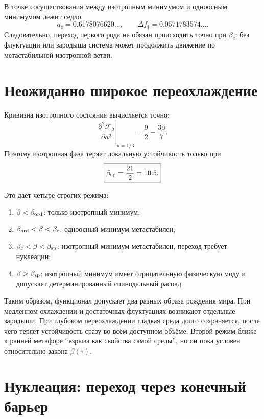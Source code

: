 В точке сосуществования между изотропным минимумом и одноосным минимумом
лежит седло
\begin{equation}
 a_\ddagger=0.6178076620\ldots,
 \qquad
 \Delta f_\ddagger=0.0571783574\ldots.
 \label{eq:v6-projective-coexistence-barrier}
\end{equation}
Следовательно, переход первого рода не обязан происходить точно при
$\beta_c$: без флуктуации или зародыша система может продолжить движение
по метастабильной изотропной ветви.

\section{Неожиданно широкое переохлаждение}

Кривизна изотропного состояния вычисляется точно:
\begin{equation}
 \left.\frac{\partial^2\mathcal F_\beta}{\partial a^2}
 \right|_{a=1/3}
 =\frac92-\frac{3\beta}{7}.
 \label{eq:v6-isotropic-curvature-exact}
\end{equation}
Поэтому изотропная фаза теряет локальную устойчивость только при
\begin{equation}
 \boxed{\beta_{\rm sp}=\frac{21}{2}=10.5.}
 \label{eq:v6-isotropic-spinodal-exact}
\end{equation}

Это даёт четыре строгих режима:
\begin{enumerate}
 \item $\beta<\beta_{\rm ord}$: только изотропный минимум;
 \item $\beta_{\rm ord}<\beta<\beta_c$: одноосный минимум метастабилен;
 \item $\beta_c<\beta<\beta_{\rm sp}$: изотропный минимум метастабилен,
 переход требует нуклеации;
 \item $\beta>\beta_{\rm sp}$: изотропный минимум имеет отрицательную
 физическую моду и допускает детерминированный спинодальный распад.
\end{enumerate}

Таким образом, функционал допускает два разных образа рождения мира.
При медленном охлаждении и достаточных флуктуациях возникают отдельные
зародыши. При глубоком переохлаждении гладкая среда долго сохраняется,
после чего теряет устойчивость сразу во всём доступном объёме. Второй
режим ближе к ранней метафоре ``взрыва как свойства самой среды'', но он
пока условен относительно закона $\beta(\tau)$.

\section{Нуклеация: переход через конечный барьер}

